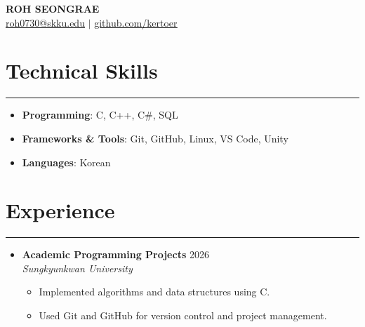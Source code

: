 \documentclass[letterpaper, 10pt]{article}
\begin{document}
\begin{center}
\textbf{\LARGE ROH SEONGRAE} \\ \vspace{2pt}
\href{mailto:roh0730@skku.edu}{\underline{roh0730@skku.edu}} $|$
\href{https://github.com/kertoer}{\underline{github.com/kertoer}}
\end{center}
\section*{Technical Skills}
\hrule
\vspace{4pt}
\begin{itemize}
\item[] \textbf{Programming}: C, C++, C\#, SQL%
\item[] \textbf{Frameworks \& Tools}: Git, GitHub, Linux, VS Code, Unity %
\item[] \textbf{Languages}: Korean %
\end{itemize}
\section*{Experience}
\hrule
\vspace{4pt}
\begin{itemize}
    \item[]
        \textbf{Academic Programming Projects} \hfill 2026 \\
        \textit{Sungkyunkwan University}
        \begin{itemize}
            \item Implemented algorithms and data structures using C.
            \item Used Git and GitHub for version control and project management.
        \end{itemize}
\end{itemize}
\end{document}
